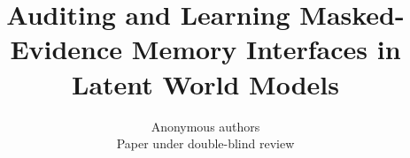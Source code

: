 \documentclass{article}
\title{Auditing and Learning Masked-Evidence Memory Interfaces in Latent World Models}
\author{Anonymous authors\\Paper under double-blind review}
\begin{document}
\maketitle
\begin{abstract}

\end{abstract}




\clearpage
\appendix

\end{document}
